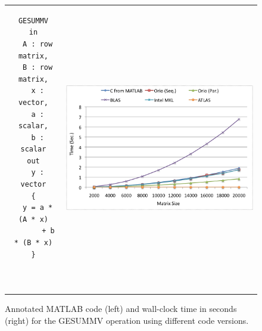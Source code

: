 \documentclass[runningheads]{llncs}
\begin{document}
\begin{figure}[htp]
\centering
\begin{tabular}{cc}
\begin{minipage}[b]{.3\textwidth}
\footnotesize
\begin{verbatim}
GESUMMV
in
  A : row matrix,
  B : row matrix,
  x : vector,
  a : scalar,
  b : scalar
out
  y : vector
{
  y = a * (A * x)
       + b * (B * x)
}



\end{verbatim}
\end{minipage}
&
\begin{minipage}[b]{.6\textwidth}
\includegraphics[width=\textwidth]{figures/gesummv.png}
\end{minipage}\\
\end{tabular}
\caption{Annotated MATLAB code (left) and wall-clock time in seconds (right) for the GESUMMV operation using different code versions.}
\label{fig:gesummv}
\end{figure}


%
\end{document}
